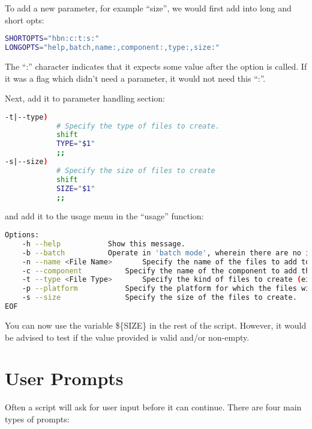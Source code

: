 \documentclass[a4paper, oneside, 11pt, titlepage, onecolumn, openright]{report}
\begin{document}
To add a new parameter, for example ``size'', we would first add into long and short opts:

\begin{lstlisting}[frame=trBL, breaklines=true, language = bash]
SHORTOPTS="hbn:c:t:s:"
LONGOPTS="help,batch,name:,component:,type:,size:"
\end{lstlisting}

The ``:'' character indicates that it expects some value after the option is called. If it was a flag which didn't need a parameter, it would not need this ``:''.

Next, add it to parameter handling section:
\begin{lstlisting}[frame=trBL, breaklines=true, language=bash]
-t|--type)
			# Specify the type of files to create.
			shift
			TYPE="$1"
			;;
-s|--size)
			# Specify the size of files to create
			shift
			SIZE="$1"
			;;
\end{lstlisting}

and add it to the usage menu in the ``usage'' function:

\begin{lstlisting}[frame=trBL, breaklines=true, language = bash]
Options:
	-h --help			Show this message.
	-b --batch			Operate in 'batch mode', wherein there are no interactive prompts.
	-n --name <File Name>		Specify the name of the files to add to the current project.
	-c --component			Specify the name of the component to add the files to.  Defaults to the 'active component'.
	-t --type <File Type>		Specify the kind of files to create (either 'C' or 'CPP').
	-p --platform			Specify the platform for which the files will be created (BareMetal/freertos)
	-s --size				Specify the size of the files to create.
EOF
\end{lstlisting}

You can now use the variable \$\{SIZE\} in the rest of the script. However, it would be advised to test if the value provided is valid and/or non-empty.

\section{User Prompts}
			\label{s:UserPrompts}
			Often a script will ask for user input before it can continue. There are four main types of prompts:
			
\end{document}
